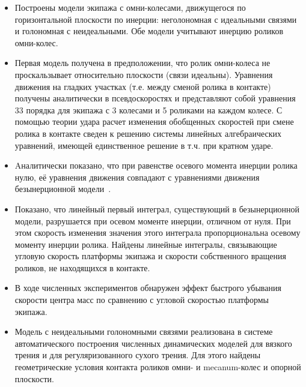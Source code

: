 \begin{itemize}
        \item {
            Построены модели экипажа с омни-колесами, движущегося по горизонтальной плоскости по инерции: неголономная с идеальными связями и голономная с неидеальными. Обе модели учитывают инерцию роликов омни-колес.
        }
        \item {
            Первая модель получена в предположении, что ролик омни-колеса не проскальзывает относительно плоскости (связи идеальны). Уравнения движения на гладких участках  (т.е. между сменой ролика в контакте) получены аналитически в псевдоскоростях и представляют собой уравнения 33 порядка для экипажа с 3 колесами и 5 роликами на каждом колесе. С помощью теории удара расчет изменения обобщенных скоростей при смене ролика в контакте сведен к решению системы линейных алгебраических уравнений, имеющей единственное решение в т.ч. при кратном ударе.
        }
        \item {
            Aналитически показано, что при равенстве осевого момента инерции ролика нулю, её уравнения движения совпадают с уравнениями движения безынерционной модели~\cite{Zobova2011}.
        }
        \item {
            Показано, что линейный первый интеграл, существующий в безынерционной модели, разрушается при осевом моменте инерции, отличном от нуля. При этом скорость изменения значения этого интеграла пропорциональна осевому моменту инерции ролика. Найдены линейные интегралы, связывающие угловую скорость платформы экипажа и скорости собственного вращения роликов, не находящихся в контакте.
        }
        \item {
            В ходе численных экспериментов обнаружен эффект быстрого убывания скорости центра масс по сравнению с угловой скоростью платформы экипажа.
        }
        \item {
            Модель с неидеальными голономными связями реализована в системе автоматического построения численных динамических моделей для вязкого трения и для регуляризованного сухого трения. Для этого найдены геометрические условия контакта роликов омни- и mecanum-колес и опорной плоскости.
}
\end{itemize}
